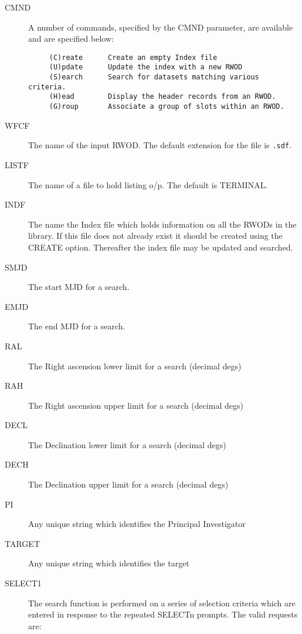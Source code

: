 \begin{description}

\item [CMND]
A number of commands, specified by the CMND parameter, are
available and are specified below:

\begin{verbatim}
     (C)reate      Create an empty Index file
     (U)pdate      Update the index with a new RWOD
     (S)earch      Search for datasets matching various criteria.
     (H)ead        Display the header records from an RWOD.
     (G)roup       Associate a group of slots within an RWOD.
\end{verbatim}

\item[WFCF   ]
The name of the input RWOD. The default extension for the file is {\tt .sdf}.

\item[LISTF   ]
The name of a file to hold listing o/p. The default is TERMINAL.

\item[INDF   ]
The name the Index file which holds information on all the RWODs
in the library. If this file does not already exist it should be created
using the CREATE option. Thereafter the index file may be
updated and searched.

\item[SMJD   ]
The start MJD for a search.

\item[EMJD   ]
The end MJD for a search.

\item[RAL    ]
The Right ascension lower limit for a search (decimal degs)

\item[RAH    ]
The Right ascension upper limit for a search (decimal degs)

\item[DECL   ]
The Declination lower limit for a search (decimal degs)

\item[DECH   ]
The Declination upper limit for a search (decimal degs)

\item[PI   ]
Any unique string which identifies the Principal Investigator

\item[TARGET   ]
Any unique string which identifies the target

\item[SELECT1]
The search function is performed on a series of selection criteria
which are entered in response to the repeated SELECTn prompts. The valid
requests are:


\end{description}
